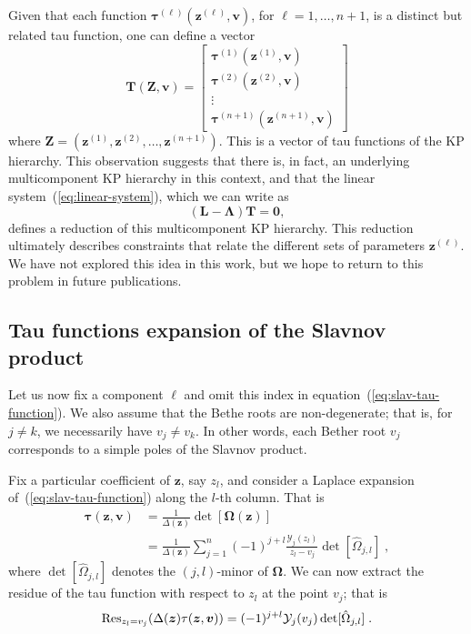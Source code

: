 \documentclass[a4paper,12pt]{amsart}
\begin{document}
Given that each function \(\bm{\tau}^{(\ell)}(\bm{z}^{(\ell)}, \bm{v})\), for
\(\ell = 1, \dots, n+1\), is a distinct but related tau function, one
can define a vector
\begin{equation}
  \bm{T}(\bm{Z}, \bm{v}) = 
\begin{bmatrix}
\bm{\tau}^{(1)}(\bm{z}^{(1)}, \bm{v}) \\ 
\bm{\tau}^{(2)}(\bm{z}^{(2)}, \bm{v}) \\ 
\vdots \\ 
\bm{\tau}^{(n+1)}(\bm{z}^{(n+1)}, \bm{v})
\end{bmatrix}
\end{equation}
where \(\bm{Z} = (\bm{z}^{(1)}, \bm{z}^{(2)}, \dots,
\bm{z}^{(n+1)})\). This is a vector of tau functions of the KP
hierarchy. This observation suggests that there is, in fact, an
underlying multicomponent KP hierarchy in this context, and that the
linear system~(\ref{eq:linear-system}), which we can write as
\begin{equation}
\left( \bm{L} - \bm{\Lambda} \right) \bm{T} = \bm{0},
\end{equation}
defines a reduction of this multicomponent KP hierarchy. This
reduction ultimately describes constraints that relate the different
sets of parameters \(\bm{z}^{(\ell)}\).  We have not explored this
idea in this work, but we hope to return to this problem in future
publications.


\subsection{Tau functions expansion of the Slavnov product}

Let us now fix a component \(\ell\) and omit this index in
equation~(\ref{eq:slav-tau-function}). We also assume that the Bethe
roots are non-degenerate; that is, for \(j \neq k\), we necessarily
have \(v_j \neq v_k\). In other words, each Bether root \(v_j\)
corresponds to a simple poles of the Slavnov product.

Fix a particular coefficient of \(\bm{z}\), say \(z_l\), and consider a Laplace
expansion of~(\ref{eq:slav-tau-function}) along the \(l\)-th column. That is
\begin{equation}
\label{eq:minor-expansion}
\begin{split}
  \bm{\tau}(\bm{z}, \bm{v})
  & = \frac{1}{\Delta(\bm{z})} \det[\bm{\Omega}(\bm{z}) ] \\
  & = \frac{1}{\Delta(\bm{z})} \sum_{j=1}^n (-1)^{j + l} \frac{\mathcal{Y}_j(z_l)}{z_l - v_j  } 
  \det[\hat{\Omega}_{j, l}]\; ,
\end{split}
\end{equation}
where \(\det[\hat{\Omega}_{j,l}]\) denotes the \((j, l)\)-minor of
\(\bm{\Omega}\). We can now extract the residue of the tau function
with respect to \(z_l\) at the point \(v_j\); that is
\begin{equation}
  \operatorname{Res}_{z_l=v_j}(\Delta(\bm{z})\tau(\bm{z}, \bm{v})) = (-1)^{j+l} \mathcal{Y}_j(v_j) \det[\hat{\Omega}_{j, l}]\;. 
\end{equation}
\end{document}
